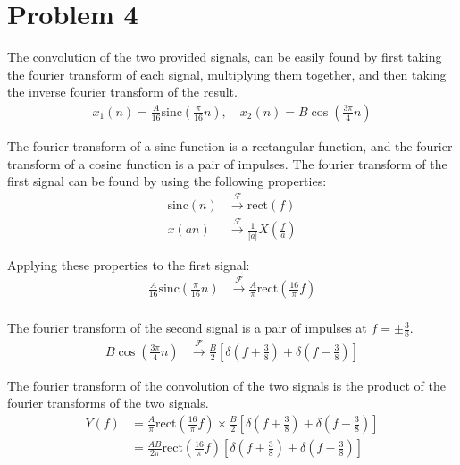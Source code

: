 \documentclass{article}
\begin{document}
\section{Problem 4}

The convolution of the two provided signals, can be easily found by first taking the fourier transform of each signal, multiplying them together, and then taking the inverse fourier transform of the result.
\begin{align*}
    x_1(n) = \frac{A}{16} \text{sinc} \left(\frac{\pi}{16}n\right), \quad x_2(n) = B\cos\left(\frac{3\pi}{4}n\right)
\end{align*}

The fourier transform of a sinc function is a rectangular function, and the fourier transform of a cosine function is a pair of impulses. The fourier transform of the first signal can be found by using the following properties:
\begin{align*}
    \text{sinc}(n) &\xrightarrow{\mathcal{F}} \text{rect}(f) \\
    x(an) &\xrightarrow{\mathcal{F}} \frac{1}{|a|}X\left(\frac{f}{a}\right)
\end{align*}

Applying these properties to the first signal:
\begin{align*}
    \frac{A}{16}\text{sinc}\left(\frac{\pi}{16}n\right) &\xrightarrow{\mathcal{F}} \frac{A}{\pi}\text{rect}\left(\frac{16}{\pi} f\right) \\
\end{align*}

The fourier transform of the second signal is a pair of impulses at $f = \pm \frac{3}{8}$.
\begin{align*}
    B\cos\left(\frac{3\pi}{4}n\right) &\xrightarrow{\mathcal{F}} \frac{B}{2}\left[\delta\left(f + \frac{3}{8}\right) + \delta\left(f - \frac{3}{8}\right)\right]
\end{align*}

The fourier transform of the convolution of the two signals is the product of the fourier transforms of the two signals.
\begin{align*}
    Y(f) &= \frac{A}{\pi}\text{rect}\left(\frac{16}{\pi} f\right) \times \frac{B}{2}\left[\delta\left(f + \frac{3}{8}\right) + \delta\left(f - \frac{3}{8}\right)\right] \\
    &= \frac{AB}{2\pi}\text{rect}\left(\frac{16}{\pi} f\right) \left[\delta\left(f + \frac{3}{8}\right) + \delta\left(f - \frac{3}{8}\right)\right]
\end{align*}
\end{document}
